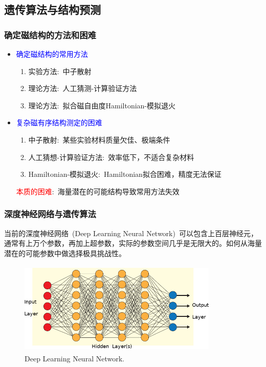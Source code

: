\documentclass[cjk,slidestop,compress,mathserif,blue]{beamer}
\begin{document}
\subsection{遗传算法与结构预测}
\frame
{
	\frametitle{确定磁结构的方法和困难}
	\begin{itemize}
                \setlength{\itemsep}{5pt}
		\item \textcolor{blue}{确定磁结构的常用方法}
			\begin{enumerate}
                                \setlength{\itemsep}{3pt}
				\item 实验方法:~中子散射
				\item 理论方法:~人工猜测-计算验证方法
				\item 理论方法:~拟合磁自由度\textrm{Hamiltonian}-模拟退火
			\end{enumerate}
		\item \textcolor{blue}{复杂磁有序结构测定的困难}
			\begin{enumerate}
                                \setlength{\itemsep}{3pt}
				\item 中子散射:~某些实验材料质量欠佳、极端条件
				\item 人工猜想-计算验证方法:~效率低下，不适合复杂材料
				\item \textrm{Hamiltonian}-模拟退火:~\textrm{Hamiltonian}拟合困难，精度无法保证
			\end{enumerate}
			\textcolor{red}{本质的困难}:~海量潜在的可能结构导致常用方法失效
	\end{itemize}
}

\frame
{
	\frametitle{深度神经网络与遗传算法}
当前的深度神经网络~\textrm{(Deep Learning Neural Network)}~可以包含上百层神经元，通常有上万个参数，再加上超参数，实际的参数空间几乎是无限大的。如何从海量潜在的可能参数中做选择极具挑战性。
\begin{figure}[h!]
\vspace*{-0.08in}
\centering
\includegraphics[height=1.75in,width=3.75in]{Figures/ANN_Algorithm.png}
\caption{\tiny \textrm{Deep Learning Neural Network.}}%
\label{Fig:Deep-Learning-NN}
\end{figure}
}
\end{document}
